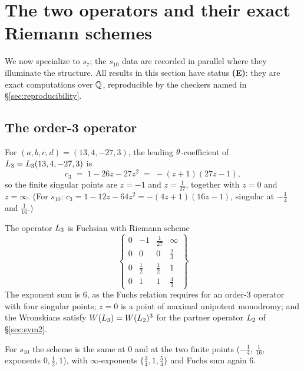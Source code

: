\section{The two operators and their exact Riemann schemes}\label{sec:operators}

We now specialize to $s_7$; the $s_{10}$ data are recorded in parallel where
they illuminate the structure. All results in this section have status
\textbf{(E)}: they are exact computations over $\mathbb{Q}$, reproducible by the
checkers named in \S\ref{sec:reproducibility}.

\subsection{The order-3 operator}

For $(a,b,c,d)=(13,4,-27,3)$, the leading $\theta$-coefficient of
$L_3 = L_3(13,4,-27,3)$ is
\[
  c_3 \;=\; 1 - 26z - 27z^2 \;=\; -(z+1)(27z-1),
\]
so the finite singular points are $z=-1$ and $z=\tfrac1{27}$, together with
$z = 0$ and $z=\infty$. (For $s_{10}$: $c_3 = 1-12z-64z^2 = -(4z+1)(16z-1)$,
singular at $-\tfrac14$ and $\tfrac1{16}$.)

\begin{proposition}
\label{prop:L3-scheme}
The operator $L_3$ is Fuchsian with Riemann scheme
\[
\begin{Bmatrix}
  0 & -1 & \tfrac1{27} & \infty \\
  \hline
  0 & 0 & 0 & \tfrac23 \\
  0 & \tfrac12 & \tfrac12 & 1 \\
  0 & 1 & 1 & \tfrac43
\end{Bmatrix}
\]
The exponent sum is $6$, as the Fuchs relation requires for an order-3
operator with four singular points; $z=0$ is a point of maximal unipotent
monodromy; and the Wronskians satisfy $W(L_3) = W(L_2)^3$ for the
partner operator $L_2$ of \S\ref{sec:sym2}.
\end{proposition}

For $s_{10}$ the scheme is the same at $0$ and at the two finite points
($-\tfrac14$, $\tfrac1{16}$, exponents $0,\tfrac12,1$), with
$\infty$-exponents $\{\tfrac34, 1, \tfrac54\}$ and Fuchs sum again $6$.


